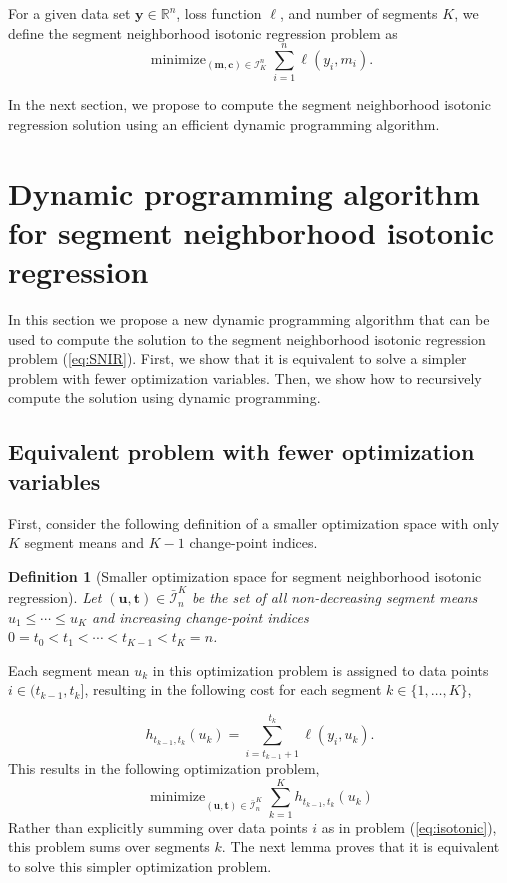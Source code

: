 \documentclass{article}
\newtheorem{definition}{Definition}
\DeclareMathOperator*{\minimize}{minimize}
\newcommand{\RR}{\mathbb R}
\begin{document}
For a given data set $\mathbf y\in\RR^n$, loss function $\ell$, and
number of segments $K$, we define the segment neighborhood isotonic regression
problem as
\begin{equation}
  \label{eq:SNIR}
  \minimize_{(\mathbf m, \mathbf c)\in\mathcal I_K^n} \sum_{i=1}^n \ell(y_i, m_i).
\end{equation}

In the next section, we propose to compute the segment neighborhood isotonic regression solution
using an efficient dynamic programming algorithm.

\newcommand{\FCC}{\widetilde{C}}
\newcommand{\M}{\mathcal{M}}
\section{Dynamic programming algorithm for segment neighborhood isotonic regression}

In this section we propose a new dynamic programming algorithm that
can be used to compute the solution to the segment neighborhood isotonic
regression problem (\ref{eq:SNIR}). First, we show
that it is equivalent to solve a simpler problem with fewer
optimization variables. Then, we show how to recursively compute the
solution using dynamic programming.

\subsection{Equivalent problem with fewer optimization 
variables}

First, consider the following definition of a smaller optimization
space with only $K$ segment means and $K-1$ change-point indices.

\begin{definition}[Smaller optimization space for segment neighborhood isotonic regression]
\label{def:Ibar}
  Let $(\mathbf u, \mathbf t)\in\bar{\mathcal I}_n^K$ be the set of
  all non-decreasing segment means $u_1\leq\cdots\leq u_K$ and
  increasing change-point indices $0=t_0<t_1<\cdots<t_{K-1}<t_K=n$.
\end{definition}

Each segment mean $u_k$ in this optimization problem is assigned to
data points $i\in(t_{k-1},t_k]$, resulting in the following cost
for each segment $k\in\{1, \dots, K\}$,

\begin{equation}
  \label{eq:h}
  h_{t_{k-1}, t_k}(u_k) = \sum_{i=t_{k-1}+1}^{t_k} \ell(y_i, u_k).
\end{equation}
This results in the following optimization problem,
\begin{equation}
  \label{eq:isotonic_ut}
  \minimize_{(\mathbf u, \mathbf t)\in\bar{\mathcal I}_n^K}
  \sum_{k=1}^K
  h_{t_{k-1}, t_k}(u_k)
\end{equation}
Rather than explicitly summing over data points $i$ as in problem
(\ref{eq:isotonic}), this problem sums over segments $k$. The next lemma
proves that it is equivalent to solve this simpler optimization problem.
\end{document}
